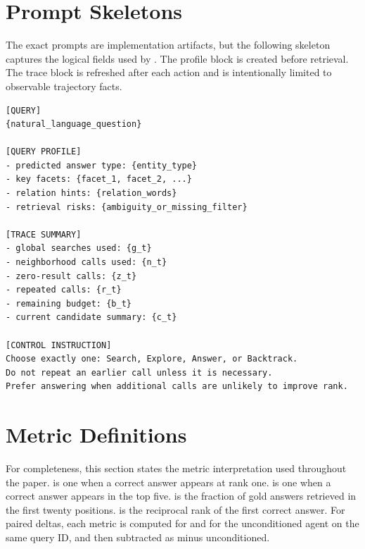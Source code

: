 \section{Prompt Skeletons}
The exact prompts are implementation artifacts, but the following skeleton captures the logical fields used by \tb. The profile block is created before retrieval. The trace block is refreshed after each action and is intentionally limited to observable trajectory facts.

{\footnotesize
\begin{verbatim}
[QUERY]
{natural_language_question}

[QUERY PROFILE]
- predicted answer type: {entity_type}
- key facets: {facet_1, facet_2, ...}
- relation hints: {relation_words}
- retrieval risks: {ambiguity_or_missing_filter}

[TRACE SUMMARY]
- global searches used: {g_t}
- neighborhood calls used: {n_t}
- zero-result calls: {z_t}
- repeated calls: {r_t}
- remaining budget: {b_t}
- current candidate summary: {c_t}

[CONTROL INSTRUCTION]
Choose exactly one: Search, Explore, Answer, or Backtrack.
Do not repeat an earlier call unless it is necessary.
Prefer answering when additional calls are unlikely to improve rank.
\end{verbatim}}

\section{Metric Definitions}
For completeness, this section states the metric interpretation used throughout the paper.  is one when a correct answer appears at rank one.  is one when a correct answer appears in the top five.  is the fraction of gold answers retrieved in the first twenty positions. \mrr is the reciprocal rank of the first correct answer. For paired deltas, each metric is computed for \tb and for the unconditioned agent on the same query ID, and then subtracted as \tb minus unconditioned.
